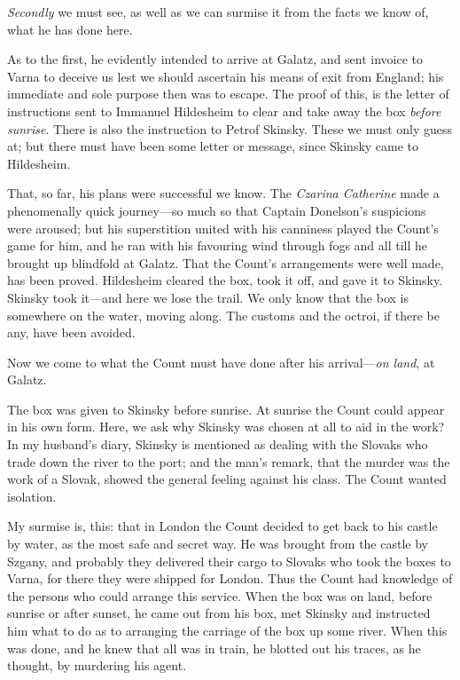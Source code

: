 \textit{Secondly} we must see, as well as we can surmise it from the facts we know of, what he has done here.

As to the first, he evidently intended to arrive at Galatz, and sent invoice to Varna to deceive us lest we should ascertain his means of exit from England; his immediate and sole purpose then was to escape. The proof of this, is the letter of instructions sent to Immanuel Hildesheim to clear and take away the box \textit{before sunrise}. There is also the instruction to Petrof Skinsky. These we must only guess at; but there must have been some letter or message, since Skinsky came to Hildesheim.

That, so far, his plans were successful we know. The \textit{Czarina Catherine} made a phenomenally quick journey—so much so that Captain Donelson's suspicions were aroused; but his superstition united with his canniness played the Count's game for him, and he ran with his favouring wind through fogs and all till he brought up blindfold at Galatz. That the Count's arrangements were well made, has been proved. Hildesheim cleared the box, took it off, and gave it to Skinsky. Skinsky took it—and here we lose the trail. We only know that the box is somewhere on the water, moving along. The customs and the octroi, if there be any, have been avoided.

Now we come to what the Count must have done after his arrival—\textit{on land}, at Galatz.

The box was given to Skinsky before sunrise. At sunrise the Count could appear in his own form. Here, we ask why Skinsky was chosen at all to aid in the work? In my husband's diary, Skinsky is mentioned as dealing with the Slovaks who trade down the river to the port; and the man's remark, that the murder was the work of a Slovak, showed the general feeling against his class. The Count wanted isolation.

My surmise is, this: that in London the Count decided to get back to his castle by water, as the most safe and secret way. He was brought from the castle by Szgany, and probably they delivered their cargo to Slovaks who took the boxes to Varna, for there they were shipped for London. Thus the Count had knowledge of the persons who could arrange this service. When the box was on land, before sunrise or after sunset, he came out from his box, met Skinsky and instructed him what to do as to arranging the carriage of the box up some river. When this was done, and he knew that all was in train, he blotted out his traces, as he thought, by murdering his agent.

